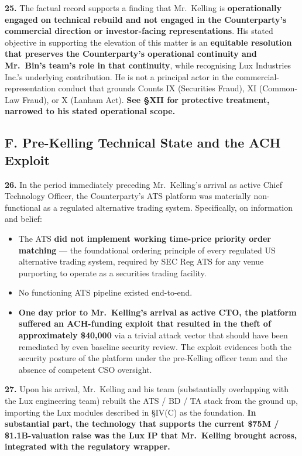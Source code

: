 \documentclass[11pt,letterpaper]{article}
\begin{document}
\textbf{25.} The factual record supports a finding that Mr.\ Kelling
is \textbf{operationally engaged on technical rebuild and not engaged
in the Counterparty's commercial direction or investor-facing
representations}. His stated objective in supporting the elevation of
this matter is an \textbf{equitable resolution that preserves the
Counterparty's operational continuity and Mr.\ Bin's team's role in
that continuity}, while recognising Lux Industries Inc.'s underlying
contribution. He is not a principal actor in the commercial-
representation conduct that grounds Counts IX (Securities Fraud), XI
(Common-Law Fraud), or X (Lanham Act). \textbf{See \S XII for
protective treatment, narrowed to his stated operational scope.}

\subsection*{F. Pre-Kelling Technical State and the ACH Exploit}

\textbf{26.} In the period immediately preceding Mr.\ Kelling's
arrival as active Chief Technology Officer, the Counterparty's ATS
platform was materially non-functional as a regulated alternative
trading system. Specifically, on information and belief:

\begin{itemize}[leftmargin=2em,itemsep=0.1em]
\item The ATS \textbf{did not implement working time-price priority
order matching} --- the foundational ordering principle of every
regulated US alternative trading system, required by SEC Reg ATS
for any venue purporting to operate as a securities trading facility.
\item No functioning ATS pipeline existed end-to-end.
\item \textbf{One day prior to Mr.\ Kelling's arrival as active CTO,
the platform suffered an ACH-funding exploit that resulted in the
theft of approximately \$40,000} via a trivial attack vector that
should have been remediated by even baseline security review. The
exploit evidences both the security posture of the platform under
the pre-Kelling officer team and the absence of competent CSO
oversight.
\end{itemize}

\textbf{27.} Upon his arrival, Mr.\ Kelling and his team (substantially
overlapping with the Lux engineering team) rebuilt the ATS / BD / TA
stack from the ground up, importing the Lux modules described in
\S IV(C) as the foundation. \textbf{In substantial part, the
technology that supports the current \$75M / \$1.1B-valuation raise was the Lux
IP that Mr.\ Kelling brought across, integrated with the regulatory
wrapper.}
\end{document}
